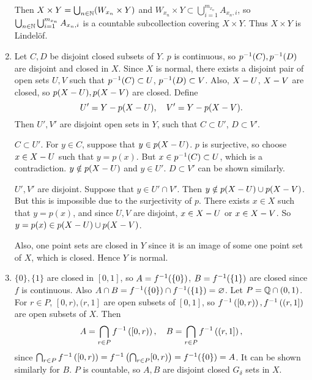 \documentclass[12pt]{report}
\newcommand{\prob}[1]{\item[\large\textbf{\sffamily #1.}]}
\begin{document}
\begin{enumerate}
    Then \(X \times Y = \bigcup_{n\in \mathbb{N}} (W_{x_n} \times Y)\) and \(W_{x_n} \times Y \subset \bigcup_{i=1}^{m_{x_n}} A_{x_n, i}\), so \(\bigcup_{n\in \mathbb{N}} \bigcup_{i=1}^{m_{x_n}} A_{x_n, i}\) is a countable subcollection covering \(X \times Y\). Thus \(X \times Y\) is Lindelöf.

    \prob{3} Let \(C, D\) be disjoint closed subsets of \(Y\). \(p\) is continuous, so \(p^{-1}(C), p^{-1}(D)\) are disjoint and closed in \(X\). Since \(X\) is normal, there exists a disjoint pair of open sets \(U, V\) such that \(p^{-1}(C) \subset U\), \(p^{-1}(D) \subset V\). Also, \(X - U\), \(X - V\) are closed, so \(p(X- U), p(X- V)\) are closed. Define
    \[
        U' = Y - p(X - U), \quad V' = Y - p(X - V).
    \]
    Then \(U', V'\) are disjoint open sets in \(Y\), such that \(C \subset U'\), \(D \subset V'\).

    \(C \subset U'\). For \(y \in C\), suppose that \(y \in p(X - U)\). \(p\) is surjective, so choose \(x \in X - U\) such that \(y = p(x)\). But \(x \in p^{-1}(C) \subset U\), which is a contradiction. \(y \notin p(X - U)\) and \(y \in U'\). \(D \subset V'\) can be shown similarly.

    \(U', V'\) are disjoint. Suppose that \(y \in U' \cap V'\). Then \(y \notin p(X- U) \cup p(X - V)\). But this is impossible due to the surjectivity of \(p\). There exists \(x \in X\) such that \(y = p(x)\), and since \(U, V\) are disjoint, \(x \in X - U\) or \(x \in X - V\). So \(y = p(x) \in p(X - U) \cup p(X- V)\).

    Also, one point sets are closed in \(Y\) since it is an image of some one point set of \(X\), which is closed. Hence \(Y\) is normal.

    \prob{4} \note{\mimp} \(\{0\}, \{1\}\) are closed in \([0, 1]\), so \(A = f^{-1}(\{0\})\), \(B = f^{-1}(\{1\})\) are closed since \(f\) is continuous. Also \(A \cap B = f^{-1}(\{0\}) \cap f^{-1}(\{1\}) = \varnothing\). Let \(P = \mathbb{Q} \cap (0, 1)\). For \(r \in P\), \([0, r), (r, 1]\) are open subsets of \([0, 1]\), so \(f^{-1}\left( [0, r) \right), f^{-1}\left( (r, 1] \right)\) are open subsets of \(X\). Then
    \[
        A = \bigcap_{r \in P} f^{-1}\left( [0, r) \right), \quad B = \bigcap_{r\in P} f^{-1}\left( (r, 1] \right),
    \]
    since \(\bigcap_{r\in P} f^{-1}\left( [0, r) \right) = f^{-1}\left( \bigcap_{r \in P} [0, r) \right) = f^{-1}(\{0\}) = A\). It can be shown similarly for \(B\). \(P\) is countable, so \(A, B\) are disjoint closed \(G_\delta\) sets in \(X\).


\end{enumerate}
\end{document}
